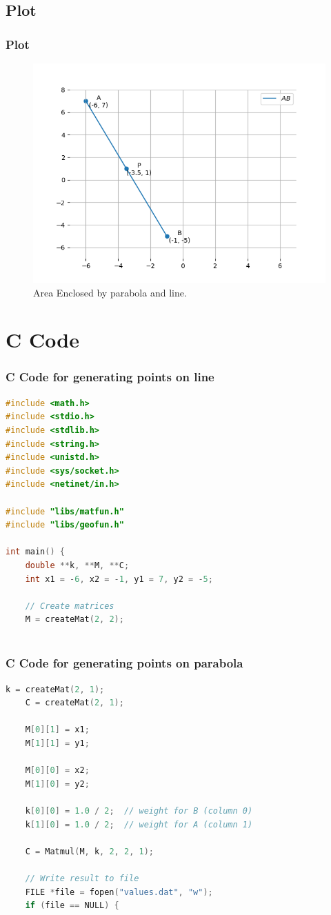 \documentclass{beamer}
\theoremstyle{remark}
\numberwithin{equation}{section}
\begin{document}
\subsection{Plot}
\begin{frame}[fragile]
\frametitle{Plot}

\begin{figure}[h!]
   \centering
   \includegraphics[width=0.9\linewidth]{figs/fig1.png}
	\caption{Area Enclosed by parabola and line. }
   \label{stemplot}
\end{figure}
\end{frame}

\section{C Code}
\begin{frame}[fragile]
\frametitle{C Code for generating points on line}
\begin{lstlisting}[language=C]
#include <math.h>
#include <stdio.h>
#include <stdlib.h>
#include <string.h>
#include <unistd.h>
#include <sys/socket.h>
#include <netinet/in.h>

#include "libs/matfun.h"
#include "libs/geofun.h"

int main() {
    double **k, **M, **C;
    int x1 = -6, x2 = -1, y1 = 7, y2 = -5;

    // Create matrices
    M = createMat(2, 2);
 
    \end{lstlisting}
\end{frame}
\begin{frame}[fragile]
\frametitle{C Code for generating points on parabola}
\begin{lstlisting}[language=C]
   k = createMat(2, 1);
    C = createMat(2, 1);

    M[0][1] = x1;  
    M[1][1] = y1;  

    M[0][0] = x2;  
    M[1][0] = y2;  
    
    k[0][0] = 1.0 / 2;  // weight for B (column 0)
    k[1][0] = 1.0 / 2;  // weight for A (column 1)

    C = Matmul(M, k, 2, 2, 1);

    // Write result to file
    FILE *file = fopen("values.dat", "w");
    if (file == NULL) {
 
\end{lstlisting}
\end{frame}
\end{document}

